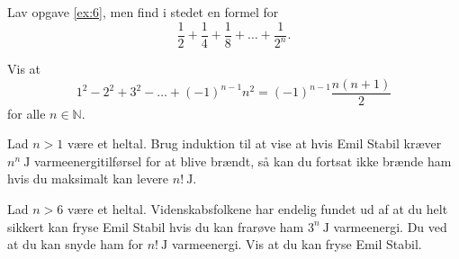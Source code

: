 \documentclass[a4paper,12pt]{article}
\theoremstyle{plain}
\newcommand{\N}{\mathbb{N}}
\begin{document}
\begin{Exercise}
  Lav opgave \ref{ex:6}, men find i stedet en formel for
  \[
    \frac{1}{2}+\frac{1}{4}+\frac{1}{8}+\dots+\frac{1}{2^n}.
  \]
\end{Exercise}
\begin{Exercise}
  Vis at
  \[
    1^2-2^2+3^2-\dots+(-1)^{n-1}n^{2}=(-1)^{n-1}\frac{n(n+1)}{2}
  \]
  for alle \(n\in\N\).
\end{Exercise}
\begin{Exercise}
  Lad \(n>1\) være et heltal. Brug induktion til at vise at hvis Emil Stabil kræver \(n^n\ \mathrm{J}\) varmeenergitilførsel for at blive brændt, så kan du fortsat ikke brænde ham hvis du maksimalt kan levere \(n!\ \mathrm{J}\).
\end{Exercise}
\begin{Exercise}
  Lad \(n>6\) være et heltal. Videnskabsfolkene har endelig fundet ud af at du helt sikkert kan fryse Emil Stabil hvis du kan frarøve ham \(3^n\ \mathrm{J}\) varmeenergi. Du ved at du kan snyde ham for \(n!\ \mathrm{J}\) varmeenergi. Vis at du kan fryse Emil Stabil.
\end{Exercise}
\end{document}
